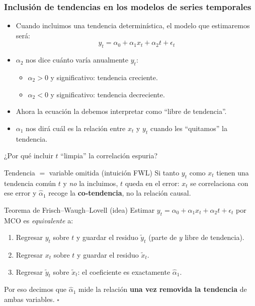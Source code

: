 \documentclass{beamer}
\begin{document}
\begin{frame}
\frametitle{Inclusión de tendencias en los modelos de series temporales}

\begin{itemize}
  \item Cuando incluimos una tendencia determinística, el modelo que estimaremos será:
  \[
  y_t = \alpha_0 + \alpha_1 x_t + \alpha_2 t + \epsilon_t
  \]
  \item \(\alpha_2\) nos dice cuánto varía anualmente \( y_t \):
  \begin{itemize}
    \item \(\alpha_2 > 0\) y significativo: tendencia creciente.
    \item \(\alpha_2 < 0\) y significativo: tendencia decreciente.
  \end{itemize}
  \item Ahora la ecuación la debemos interpretar como “libre de tendencia”.
  \item \(\alpha_1\) nos dirá cuál es la relación entre \( x_t \) y \( y_t \) cuando les “quitamos” la tendencia.
\end{itemize}

\end{frame}

\begin{frame}{¿Por qué incluir $t$ ``limpia'' la correlación espuria?}

\begin{block}{Tendencia $=$ variable omitida (intuición FWL)}
Si tanto $y_t$ como $x_t$ tienen una tendencia común $t$ y \emph{no} la incluimos, $t$ queda en el error: $x_t$ se correlaciona con ese error y $\hat\alpha_1$ recoge la \textbf{co-tendencia}, no la relación causal.
\end{block}

\pause

\begin{exampleblock}{Teorema de Frisch--Waugh--Lovell (idea)}
Estimar $y_t=\alpha_0+\alpha_1 x_t+\alpha_2 t+\epsilon_t$ por MCO es \emph{equivalente} a:
\begin{enumerate}
  \item Regresar $y_t$ sobre $t$ y guardar el residuo $\tilde y_t$ (parte de $y$ libre de tendencia).
  \item Regresar $x_t$ sobre $t$ y guardar el residuo $\tilde x_t$.
  \item Regresar $\tilde y_t$ sobre $\tilde x_t$: el coeficiente es exactamente $\hat\alpha_1$.
\end{enumerate}
Por eso decimos que $\hat\alpha_1$ mide la relación \textbf{una vez removida la tendencia} de ambas variables. \hfill $\square$
\end{exampleblock}

\end{frame}
\end{document}
